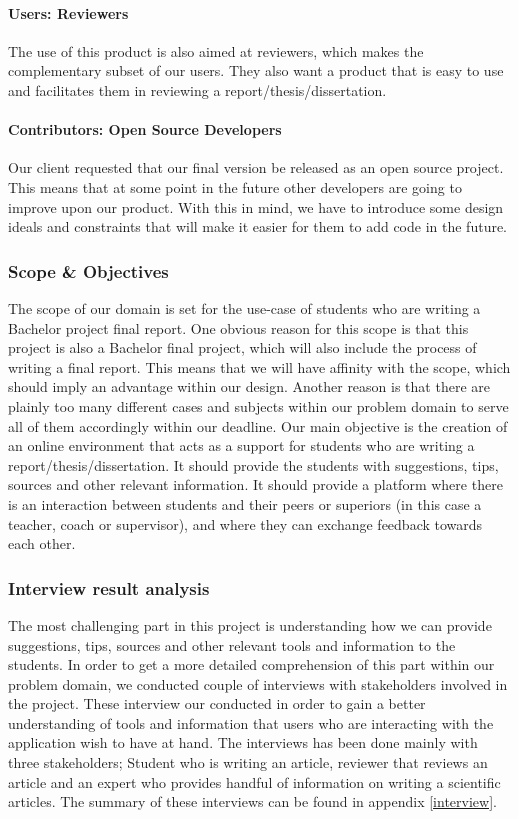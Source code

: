 \paragraph{Users: Reviewers} The use of this product is also aimed at reviewers, which makes the complementary subset of our users. They also want a product that is easy to use and facilitates them in reviewing a report/thesis/dissertation.

\paragraph{Contributors: Open Source Developers} Our client requested that our final version be released as an open source project. This means that at some point in the future other developers are going to improve upon our product. With this in mind, we have to introduce some design ideals and constraints that will make it easier for them to add code in the future.

\subsubsection{Scope \& Objectives}

The scope of our domain is set for the use-case of students who are writing a Bachelor project final report. One obvious reason for this scope is that this project is also a Bachelor final project, which will also include the process of writing a final report. This means that we will have affinity with the scope, which should imply an advantage within our design. Another reason is that there are plainly too many different cases and subjects within our problem domain to serve all of them accordingly within our deadline.
Our main objective is the creation of an online environment that acts as a support for students who are writing a report/thesis/dissertation. It should provide the students with suggestions, tips, sources and other relevant information. It should provide a platform where there is an interaction between students and their peers or superiors (in this case a teacher, coach or supervisor), and where they can exchange feedback towards each other.

\subsubsection{Interview result analysis} %

The most challenging part in this project is understanding how we can provide suggestions, tips, sources and other relevant tools and information to the students. In order to get a more detailed comprehension of this part within our problem domain, we conducted couple of interviews with stakeholders involved in the project. These interview our conducted in order to gain a better understanding of tools and information that users who are interacting with the application wish to have at hand. The interviews has been done mainly with three stakeholders; Student who is writing an article, reviewer that reviews an article and an expert who provides handful of information on writing a scientific articles. The summary of these interviews can be found in appendix \ref{interview}.




